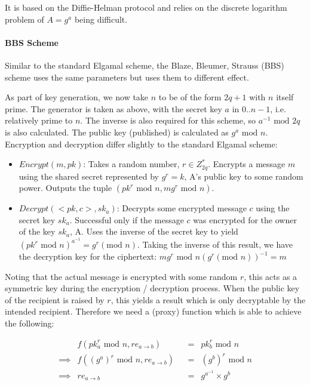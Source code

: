 It is based on the Diffie-Helman protocol and relies on the discrete logarithm problem of $A = g^a$ being difficult.

\paragraph{BBS Scheme}

Similar to the standard Elgamal scheme, the Blaze, Bleumer, Strauss (BBS) scheme uses the same parameters but uses them to different effect.

As part of key generation, we now take $n$ to be of the form $2q + 1$ with $n$ itself prime. The generator is taken as above, with the secret key $a$ in ${0..n - 1}$, i.e. relatively prime to $n$. The inverse is also required for this scheme, so $a^{-1} \text{ mod } 2q$ is also calculated. The public key (published) is calculated as $g^a \text{ mod } n$. Encryption and decryption differ slightly to the standard Elgamal scheme:

\begin{itemize}
  \item $Encrypt(m, pk)$: Takes a random number, $r \in Z_{2q}^*$. Encrypts a message $m$ using the shared secret represented by $g^r = k$, A's public key to some random power. Outputs the tuple $(pk^r \text{ mod } n, mg^r \text{ mod } n)$.
  \item $Decrypt(<pk, c>, sk_a)$: Decrypts some encrypted message $c$ using the secret key $sk_a$. Successful only if the message $c$ was encrypted for the owner of the key $sk_a$, A. Uses the inverse of the secret key to yield $(pk^r \text{ mod } n)^{a^{-1}} = g^r (\text{mod } n)$. Taking the inverse of this result, we have the decryption key for the ciphertext: $mg^r \text{ mod } n(g^r (\text{mod } n))^{-1} = m$
\end{itemize}

Noting that the actual message is encrypted with some random $r$, this acts as a symmetric key during the encryption / decryption process. When the public key of the recipient is raised by $r$, this yields a result which is only decryptable by the intended recipient. Therefore we need a (proxy) function which is able to achieve the following:

$$
\begin{aligned}
& f(pk_a^r \text{ mod } n, re_{a \rightarrow b}) & &=& pk_b^r \text{ mod } n \\
\implies & f((g^a)^r \text{ mod } n, re_{a \rightarrow b}) & &=& (g^b)^r \text{ mod } n \\
\implies & re_{a \rightarrow b} & &=& g^{a^{-1}} \times g^{b}
\end{aligned}
$$

